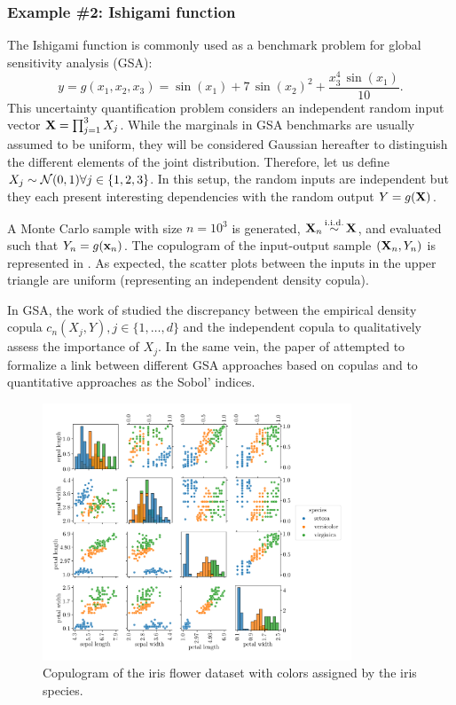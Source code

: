 \subsubsection{Example \#2: Ishigami function}

The Ishigami function is commonly used as a benchmark problem for global sensitivity analysis (GSA): 
\begin{equation}
    y = g(x_1, x_2, x_3) = \sin(x_1) + 7 \, \sin(x_2)^2 + \frac{x_3^4 \, \sin(x_1)}{10}.
\end{equation}
This uncertainty quantification problem considers an independent random input vector ${\bf X}=\prod_{j=1}^{3} X_j$. 
While the marginals in GSA benchmarks are usually assumed to be uniform, they will be considered Gaussian hereafter to distinguish the different elements of the joint distribution. 
Therefore, let us define $X_j\sim \mathcal{N}(0, 1) \forall j \in \{1, 2, 3\}$. 
In this setup, the random inputs are independent but they each present interesting dependencies with the random output $Y=g({\bf X})$.

A Monte Carlo sample with size $n=10^3$ is generated, ${\bf X}_n \mathop{\sim}\limits^{\mathrm{i.i.d.}} {\bf X}$, and evaluated such that $Y_n=g({\bf x}_n)$.  
The copulogram of the input-output sample $({\bf X}_n, Y_n)$ is represented in . 
As expected, the scatter plots between the inputs in the upper triangle are uniform (representing an independent density copula). 

In GSA, the work of \citet{poczos_2012_copulaMMD} studied the discrepancy between the empirical density copula $c_n(X_j, Y), j \in \{1, \dots, d\}$ and the independent copula to qualitatively assess the importance of $X_j$.  
In the same vein, the paper of \citet{plischke_2019_copulaGSA} attempted to formalize a link between different GSA approaches based on copulas and to quantitative approaches as the Sobol' indices. 

\begin{figure}
    \centering
    \quad\qquad\qquad\includegraphics[width=0.82\textwidth]{../numerical_experiments/chapter3/figures/iris_copulogram.png}
    \caption{Copulogram of the iris flower dataset with colors assigned by the iris species.}
    \label{fig:iris_copulogram}
\end{figure}

